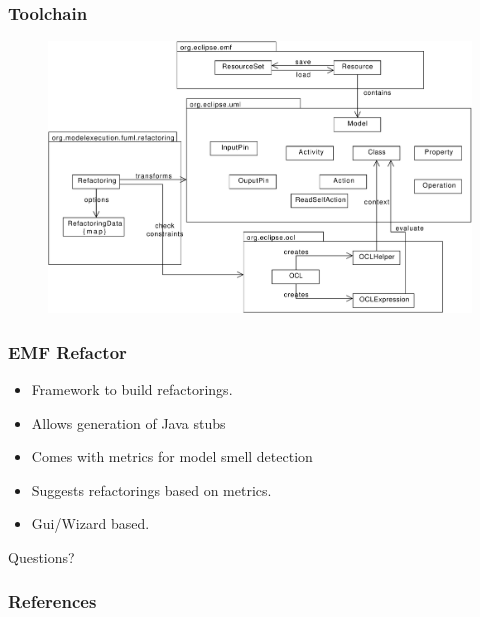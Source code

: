 \documentclass{beamer}
\begin{document}
\begin{frame}
\frametitle{Toolchain}
 \begin{figure}[h!t]
 \centering
 \includegraphics[scale=0.35]{figures/Toolchain2}
\end{figure}
\end{frame}

        
\begin{frame}
\frametitle{EMF Refactor}
\begin{itemize}
 \item Framework to build refactorings.
 \item Allows generation of Java stubs
 \item Comes with metrics for model smell detection
 \item Suggests refactorings based on metrics.
 \item Gui/Wizard based.
\end{itemize}

\end{frame}
        

\begin{frame}
 \begin{center}
\Huge Questions?
\end{center}
\end{frame}

\begin{frame}
 \frametitle{References}
 
 
\end{frame}
\end{document}
